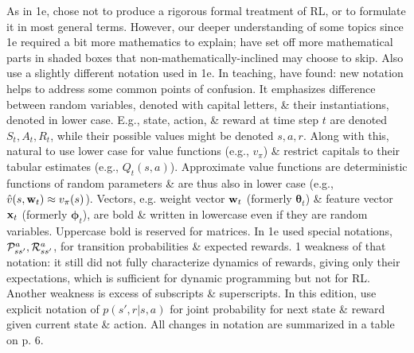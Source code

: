\documentclass{article}
\begin{document}
\begin{itemize}
    As in 1e, chose not to produce a rigorous formal treatment of RL, or to formulate it in most general terms. However, our deeper understanding of some topics since 1e required a bit more mathematics to explain; have set off more mathematical parts in shaded boxes that non-mathematically-inclined may choose to skip. Also use a slightly different notation used in 1e. In teaching, have found: new notation helps to address some common points of confusion. It emphasizes difference between random variables, denoted with capital letters, \& their instantiations, denoted in lower case. E.g., state, action, \& reward at time step $t$ are denoted $S_t,A_t,R_t$, while their possible values might be denoted $s,a,r$. Along with this, natural to use lower case for value functions (e.g., $v_\pi$) \& restrict capitals to their tabular estimates (e.g., $Q_t(s,a)$). Approximate value functions are deterministic functions of random parameters \& are thus also in lower case (e.g., $\hat{v}(s,{\bf w}_t)\approx v_\pi(s)$). Vectors, e.g. weight vector ${\bf w}_t$ (formerly $\boldsymbol{\theta}_t$) \& feature vector ${\bf x}_t$ (formerly $\boldsymbol{\phi}_t$), are bold \& written in lowercase even if they are random variables. Uppercase bold is reserved for matrices. In 1e used special notations, ${\cal P}_{ss'}^a,{\cal R}_{ss'}^a$, for transition probabilities \& expected rewards. 1 weakness of that notation: it still did not fully characterize dynamics of rewards, giving only their expectations, which is sufficient for dynamic programming but not for RL. Another weakness is excess of subscripts \& superscripts. In this edition, use explicit notation of $p(s',r|s,a)$ for joint probability for next state \& reward given current state \& action. All changes in notation are summarized in a table on p. 6.


\end{itemize}
\end{document}
